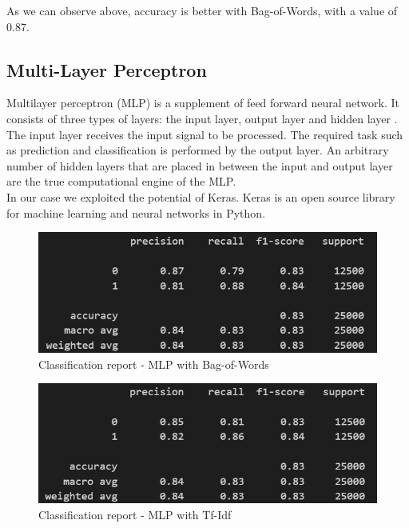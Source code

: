 \documentclass[fleqn,10pt]{SelfArx} %
\begin{document}
As we can observe above, accuracy is better with Bag-of-Words, with a value of 0.87.

\subsection{Multi-Layer Perceptron}
Multilayer perceptron (MLP) is a supplement of feed forward neural network. It consists of three types of layers: the input layer, output layer and hidden layer \cite{MLP}.\\
The input layer receives the input signal to be processed. The required task such as prediction and classification is performed by the output layer. An arbitrary number of hidden layers that are placed in between the input and output layer are the true computational engine of the MLP.\\
In our case we exploited the potential of Keras. Keras is an open source library for machine learning and neural networks in Python.

\begin{figure}[H]
\begin{center}
  \includegraphics[scale=0.6]{./images/MLP_BoW.png}
\end{center}
  \caption{Classification report - MLP with Bag-of-Words}
\end{figure}

\begin{figure}[H]
\begin{center}
  \includegraphics[scale=0.6]{./images/MLP_TFIDF.png}
\end{center}
  \caption{Classification report - MLP with Tf-Idf}
\end{figure}
\end{document}
